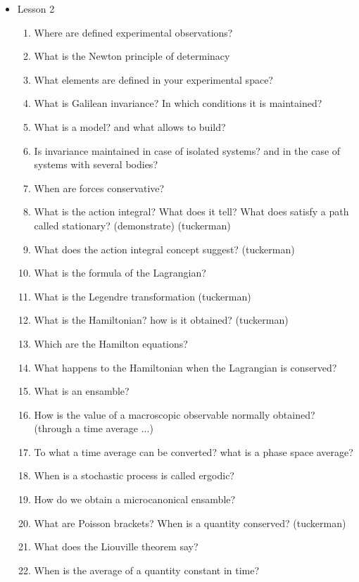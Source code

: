 {\begin{itemize}
\begin{enumerate}
        \item What procedure allows the coarse-graining?
    \end{enumerate}
    \item Lesson 2
    \begin{enumerate}
    \item Where are defined experimental observations?
        \item What is the Newton principle of determinacy
        \item What elements are defined in your experimental space?
        \item What is Galilean invariance? In which conditions it is maintained?
        \item What is a model? and what allows to build?
        \item Is invariance maintained in case of isolated systems? and in the case of systems with several bodies?
        \item When are forces conservative?
        \item What is the action integral? What does it tell? What does satisfy a path called stationary? (demonstrate) (tuckerman)
        \item What does the action integral concept suggest? (tuckerman)
        \item What is the formula of the Lagrangian?
        \item What is the Legendre transformation (tuckerman)
        \item What is the Hamiltonian? how is it obtained? (tuckerman)
        \item Which are the Hamilton equations?
        \item What happens to the Hamiltonian when the Lagrangian is conserved?
        \item What is an ensamble?
        \item How is the value of a macroscopic observable normally obtained? (through a time average ...)
        \item To what a time average can be converted? what is a phase space average?
        \item When is a stochastic process is called ergodic?
        \item How do we obtain a microcanonical ensamble?
        \item What are Poisson brackets? When is a quantity conserved? (tuckerman)
        \item What does the Liouville theorem say?
        \item When is the average of a quantity constant in time?

\end{enumerate}
\end{itemize}}
